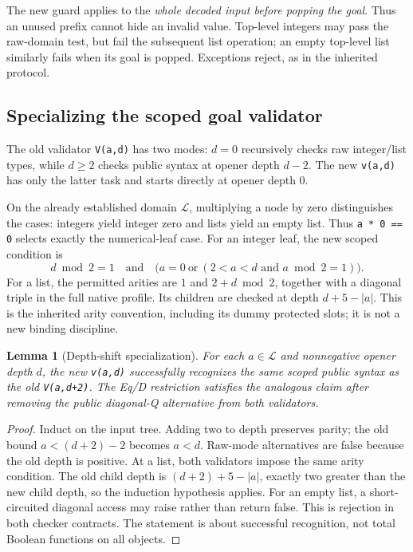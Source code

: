\documentclass[11pt,letterpaper]{article}
\newtheorem{lemma}[theorem]{Lemma}
\theoremstyle{definition}
\theoremstyle{remark}
\begin{document}
The new guard applies to the \emph{whole decoded input before popping the
goal}. Thus an unused prefix cannot hide an invalid value. Top-level
integers may pass the raw-domain test, but fail the subsequent list operation;
an empty top-level list similarly fails when its goal is popped. Exceptions
reject, as in the inherited protocol.

\subsection{Specializing the scoped goal validator}
The old validator \texttt{V(a,d)} has two modes: $d=0$ recursively checks
raw integer/list types, while $d\ge2$ checks public syntax at opener depth
$d-2$. The new \texttt{v(a,d)} has only the latter task and starts directly
at opener depth $0$.

On the already established domain $\mathcal L$, multiplying a node by zero
distinguishes the cases: integers yield integer zero and lists yield an
empty list. Thus \texttt{a * 0 == 0} selects exactly the numerical-leaf case.
For an integer leaf, the new scoped condition is
\[
 d\bmod2=1\quad\text{and}\quad
 \bigl(a=0\ \text{or}\ (2<a<d\text{ and }a\bmod2=1)\bigr).
\]
For a list, the permitted arities are $1$ and $2+d\bmod2$, together with a
diagonal triple in the full native profile. Its children are checked at
depth $d+5-\lvert a\rvert$. This is the inherited arity convention, including
its dummy protected slots; it is not a new binding discipline.

\begin{lemma}[Depth-shift specialization]
\label{lem:depthshift}
For each $a\in\mathcal L$ and nonnegative opener depth $d$, the new
\texttt{v(a,d)} successfully recognizes the same scoped public syntax as
the old \texttt{V(a,d+2)}. The Eq/D restriction satisfies the analogous claim
after removing the public diagonal-Q alternative from both validators.
\end{lemma}
\begin{proof}
Induct on the input tree. Adding two to depth preserves parity; the old
bound $a<(d+2)-2$ becomes $a<d$. Raw-mode alternatives are false because
the old depth is positive. At a list, both validators impose the same arity
condition. The old child depth is $(d+2)+5-\lvert a\rvert$, exactly two
greater than the new child depth, so the induction hypothesis applies.
For an empty list, a short-circuited diagonal access may raise rather than
return false. This is rejection in both checker contracts. The statement
is about successful recognition, not total Boolean functions on all objects.
\end{proof}
\end{document}
